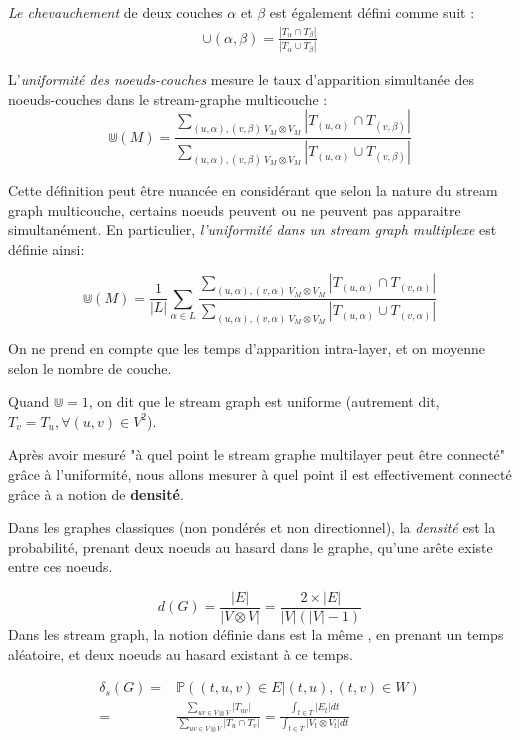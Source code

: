 \documentclass[11pt,a4paper]{article}
\theoremstyle{definition}
\theoremstyle{remark}
\theoremstyle{remark}
\def \stg {stream graph}
\begin{document}
	{\em Le chevauchement} de deux couches $\alpha$ et $\beta$ est également défini comme suit :
	\begin{align*}
		\cup(\alpha,\beta) = \frac{|T_{\alpha}\cap T_{\beta}|}{|T_{\alpha}\cup T_{\beta}|}
	\end{align*}

    L'{\em uniformité des noeuds-couches} mesure le taux d'apparition simultanée des noeuds-couches dans le stream-graphe multicouche :
    \[
    	\Cup(M) = \frac{\sum_{(u,\alpha),(v,\beta) \ V_M \otimes V_M}{|T_{(u,\alpha)} \cap T_{(v,\beta)}|}}{\sum_{(u,\alpha),(v,\beta) \ V_M \otimes V_M}{|T_{(u,\alpha)}\cup T_{(v,\beta)}|}}
    \]
	
	Cette définition peut être nuancée en considérant que selon la nature du stream graph multicouche, certains noeuds peuvent ou ne peuvent pas apparaitre simultanément. En particulier, {\em l'uniformité dans un stream graph multiplexe} est définie ainsi:	
	
	\[
    	\Cup(M) = \frac{1}{|L|}\sum_{\alpha \in L} \frac{\sum_{(u,\alpha),(v,\alpha) \ V_M \otimes V_M}{|T_{(u,\alpha)} \cap T_{(v,\alpha)}|}}{\sum_{(u,\alpha),(v,\alpha) \ V_M \otimes V_M}{|T_{(u,\alpha)}\cup T_{(v,\alpha)}|}}
    \]
    
    On ne prend en compte que les temps d'apparition intra-layer, et on moyenne selon le nombre de couche. 


	Quand $\Cup=1$, on dit que le stream graph est uniforme (autrement dit, $T_v = T_u, \forall (u,v) \in V^2$).


    Après avoir mesuré "à quel point le stream graphe multilayer peut être connecté" grâce à l'uniformité, nous allons mesurer à quel point il est effectivement connecté grâce à a notion de \textbf{densité}.
    
    Dans les graphes classiques (non pondérés et non directionnel), la {\em densité} est la probabilité, prenant deux noeuds au hasard dans le graphe, qu'une arête existe entre ces noeuds.
    
		\[
			d(G) = \frac{|E|}{|V\otimes V|} = \frac{2\times |E|}{|V|(|V|-1)}
		\]
	Dans les \stg{}, la notion définie dans \cite{stream} est la même , en prenant un temps aléatoire, et deux noeuds au hasard existant à ce temps. 	

		\begin{align*}
			\delta_s(G) = & \mathbb{P}((t,u,v)\in E| (t,u),(t,v) \in W) \\
			 =  & \frac{\sum_{uv \in V \otimes V}{|T_{uv}|}}{\sum_{uv \in V\otimes V}{|T_u\cap T_v|}}= \frac{\int_{t\in T}{|E_t|dt}}{\int_{t\in T}{|V_t\otimes V_t|dt}}
		\end{align*}
		
\end{document}
